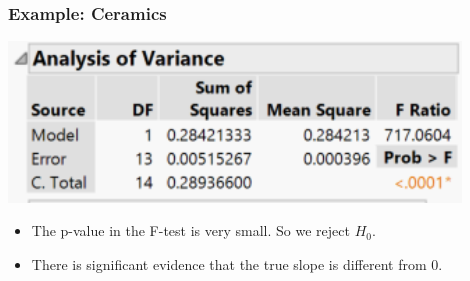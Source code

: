 \documentclass[handout]{beamer}\usepackage[]{graphicx}\usepackage[]{color}
\numberwithin{equation}{section}
\begin{document}
\begin{frame}
\frametitle{Example: Ceramics}
\begin{center}
\includegraphics[width = 0.9\textwidth]{../../fig/ch9SLR_ceramics_ANOVA.PNG}
\end{center}
\begin{itemize}
\item
The p-value in the F-test is very small. So we reject $H_0$. 
\item There is significant evidence that the true slope is different from 0.
\end{itemize}
\end{frame}
\end{document}
